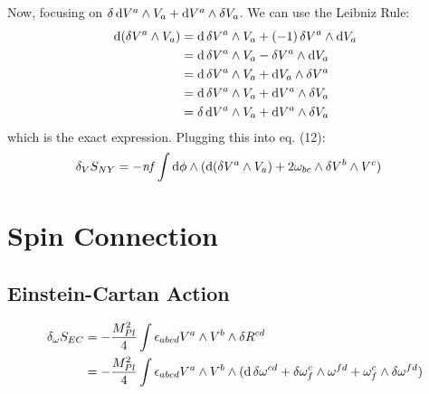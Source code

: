 \documentclass[12pt]{article}
\begin{document}
Now, focusing on $\var{\dd{V^a}} \wedge V_a + \dd V^a \wedge \var{V_a}$. We can use the Leibniz Rule:
\begin{align*}
  \dd(\var{V^a} \wedge V_a) &= \dd{\var{V^a}} \wedge V_a + (-1)\var{V^a} \wedge \dd{V_a} \\
  &= \dd{\var{V^a}} \wedge V_a - \var{V^a} \wedge \dd{V_a} \\
  &= \dd{\var{V^a}} \wedge V_a + \dd{V_a} \wedge \var{V^a} \\
  &= \dd{\var{V^a}} \wedge V_a + \dd{V^a} \wedge \var{V_a} \\
  &= \var{\dd{V^a}} \wedge V_a + \dd{V^a} \wedge \var{V_a}
\end{align*}
which is the exact expression. Plugging this into eq. (12):
\begin{align*}
  \var_V{S_{NY}} &= -\mathit{nf}\int \dd\phi \wedge (\dd(\var{V^a} \wedge V_a) + 2\omega_{bc} \wedge \var{V^b} \wedge V^c)
\end{align*}

\section{Spin Connection}
\subsection{Einstein-Cartan Action}
\begin{align*}
  \var_\omega{S_{EC}} &= -\frac{M_{Pl}^2}{4} \int \epsilon_{abcd}V^a \wedge V^b \wedge \var{R^{cd}} \\
  &= -\frac{M_{Pl}^2}{4} \int \epsilon_{abcd}V^a \wedge V^b \wedge (\dd{\var{\omega^{cd}}} + \var{\omega^c_f} \wedge \omega^{fd} + \omega^c_f \wedge \var{\omega^{fd}}) \\
\end{align*}
\end{document}
